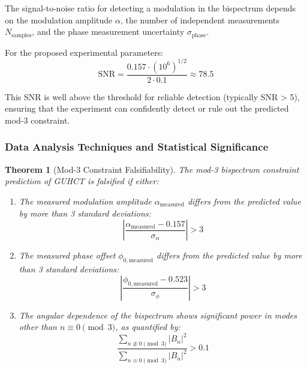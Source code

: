\documentclass[11pt,a4paper]{article}
\makeatletter
\newtheorem{theorem}{Theorem}[section]
\renewenvironment{proof}[1][\proofname]{\par
  \pushQED{\qed}%
  \normalfont \topsep6\p@\@plus6\p@\relax
  \trivlist
  \item[\hskip\labelsep
        \itshape
    #1\@addpunct{.}]\ignorespaces
}{%
  \popQED\endtrivlist\@endpefalse
}
\makeatother
\begin{document}
\begin{proof}
The signal-to-noise ratio for detecting a modulation in the bispectrum depends on the modulation amplitude $\alpha$, the number of independent measurements $N_{\text{samples}}$, and the phase measurement uncertainty $\sigma_{\text{phase}}$.

For the proposed experimental parameters:
\begin{equation}
\text{SNR} = \frac{0.157 \cdot (10^6)^{1/2}}{2 \cdot 0.1} \approx 78.5
\end{equation}

This SNR is well above the threshold for reliable detection (typically SNR > 5), ensuring that the experiment can confidently detect or rule out the predicted mod-3 constraint.
\end{proof}

\subsubsection{Data Analysis Techniques and Statistical Significance}
\label{ssubsec:bispectrum_analysis}

\begin{theorem}[Mod-3 Constraint Falsifiability]
\label{thm:mod3_falsifiability}
The mod-3 bispectrum constraint prediction of GUHCT is falsified if either:
\begin{enumerate}
    \item The measured modulation amplitude $\alpha_{\text{measured}}$ differs from the predicted value by more than 3 standard deviations:
    \begin{equation}
    \left|\frac{\alpha_{\text{measured}} - 0.157}{\sigma_{\alpha}}\right| > 3
    \end{equation}
    
    \item The measured phase offset $\phi_{0,\text{measured}}$ differs from the predicted value by more than 3 standard deviations:
    \begin{equation}
    \left|\frac{\phi_{0,\text{measured}} - 0.523}{\sigma_{\phi}}\right| > 3
    \end{equation}
    
    \item The angular dependence of the bispectrum shows significant power in modes other than $n \equiv 0 \pmod{3}$, as quantified by:
    \begin{equation}
    \frac{\sum_{n \not\equiv 0 \pmod{3}} |B_n|^2}{\sum_{n \equiv 0 \pmod{3}} |B_n|^2} > 0.1
    \end{equation}
\end{enumerate}
\end{theorem}
\end{document}
